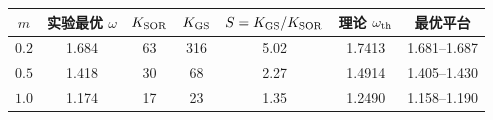 \begin{tabular}{ccccccc}
\toprule
$m$ & 实验最优 $\omega$ & $K_{\rm SOR}$ & $K_{\rm GS}$ & $S=K_{\rm GS}/K_{\rm SOR}$ & 理论 $\omega_{\rm th}$ & 最优平台 \\
\midrule
$0.2$ & 1.684 & 63 & 316 & 5.02 & 1.7413 & 1.681--1.687 \\
$0.5$ & 1.418 & 30 & 68 & 2.27 & 1.4914 & 1.405--1.430 \\
$1.0$ & 1.174 & 17 & 23 & 1.35 & 1.2490 & 1.158--1.190 \\
\bottomrule
\end{tabular}
